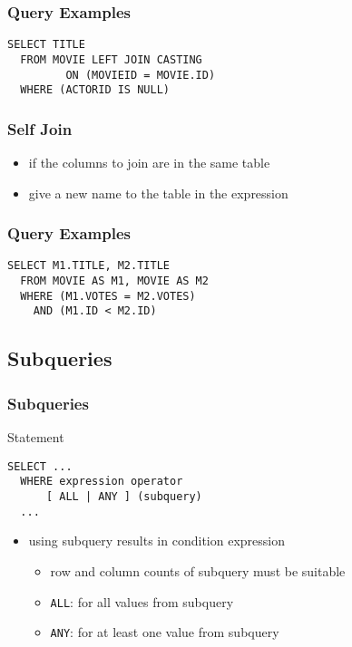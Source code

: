 \documentclass[dvipsnames]{beamer}
\theoremstyle{plain}
\begin{document}
\begin{frame}[fragile]
  \frametitle{Query Examples}

  \begin{example}
    \begin{lstlisting}
SELECT TITLE
  FROM MOVIE LEFT JOIN CASTING
         ON (MOVIEID = MOVIE.ID)
  WHERE (ACTORID IS NULL)
    \end{lstlisting}
  \end{example}
\end{frame}

\begin{frame}[fragile]
  \frametitle{Self Join}

  \begin{itemize}
    \item if the columns to join are in the same table
    \item give a new name to the table in the expression
  \end{itemize}
\end{frame}

\begin{frame}[fragile]
  \frametitle{Query Examples}

  \begin{example}
    \lstinline!SELECT M1.TITLE, M2.TITLE!\\
    \lstinline!  FROM MOVIE AS M1, MOVIE AS M2!\\
    \lstinline!  WHERE (M1.VOTES = M2.VOTES)!\\
    \pause
    \lstinline!    AND (M1.ID < M2.ID)!
  \end{example}
\end{frame}

\subsection{Subqueries}

\begin{frame}[fragile]
  \frametitle{Subqueries}

  \begin{block}{Statement}
    \begin{lstlisting}
SELECT ...
  WHERE expression operator
      [ ALL | ANY ] (subquery)
  ...
    \end{lstlisting}
  \end{block}

  \begin{itemize}
    \item using subquery results in condition expression
    \pause
    \begin{itemize}
      \item row and column counts of subquery must be suitable
      \item \lstinline!ALL!: for all values from subquery
      \item \lstinline!ANY!: for at least one value from subquery
    \end{itemize}
  \end{itemize}
\end{frame}
\end{document}
